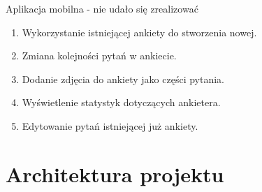\documentclass[a4paper,10pt]{beamer}
\begin{document}
		\begin{frame}{Aplikacja mobilna - nie udało się zrealizować}
			\begin{enumerate}
				\item	Wykorzystanie istniejącej ankiety do stworzenia nowej.
				\item	Zmiana kolejności pytań w ankiecie.
				\item	Dodanie zdjęcia do ankiety jako części pytania.
				\item	Wyświetlenie statystyk dotyczących ankietera.
			    \item	Edytowanie pytań istniejącej już ankiety.
			\end{enumerate}
		\end{frame}
		
		\section{Architektura projektu}
		
\end{document}
